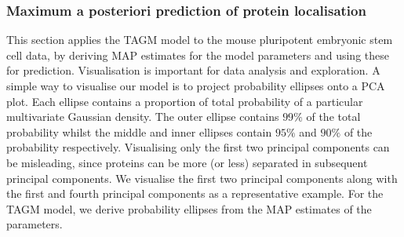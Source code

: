 \documentclass[12pt,english]{article}\usepackage[]{graphicx}\usepackage[]{color}
\begin{document}
\subsubsection*{Maximum a posteriori prediction of protein localisation}

This section applies the TAGM model to the mouse pluripotent embryonic
stem cell data, by deriving MAP estimates for the model parameters and
using these for prediction.  Visualisation is important for data
analysis and exploration. A simple way to visualise our model is to
project probability ellipses onto a PCA plot. Each ellipse contains a
proportion of total probability of a particular multivariate Gaussian
density.  The outer ellipse contains $99\%$ of the total probability
whilst the middle and inner ellipses contain $95\%$ and $90\%$ of the
probability respectively. Visualising only the first two principal
components can be misleading, since proteins can be more (or less)
separated in subsequent principal components.  We visualise the first two
principal components along with the first and fourth principal
components as a representative example. For the TAGM model, we derive
probability ellipses from the MAP estimates of the parameters.
\end{document}
